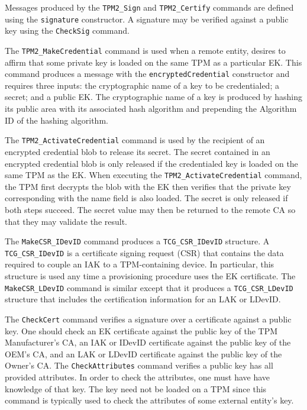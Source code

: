 \documentclass[runningheads]{llncs}
\begin{document}
Messages produced by the \verb|TPM2_Sign| and \verb|TPM2_Certify|
commands are defined using the \verb|signature| constructor. A
signature may be verified against a public key using the
\verb|CheckSig| command.

The \verb|TPM2_MakeCredential| command is used when a remote entity,
desires to affirm that some private key is loaded on the same TPM as a
particular EK. This command produces a message with the
\verb|encryptedCredential| constructor and requires three inputs: the
cryptographic name of a key to be credentialed; a secret; and a public
EK. The cryptographic name of a key is produced by hashing its public
area with its associated hash algorithm and prepending the Algorithm
ID of the hashing algorithm.

The \verb|TPM2_ActivateCredential| command is used by the recipient of
an encrypted credential blob to release its secret.  The secret
contained in an encrypted credential blob is only released if the
credentialed key is loaded on the same TPM as the EK.  When executing
the \verb|TPM2_ActivateCredential| command, the TPM first decrypts the
blob with the EK then verifies that the private key corresponding with
the name field is also loaded. The secret is only released if both
steps succeed. The secret value may then be returned to the remote CA
so that they may validate the result.

The \verb|MakeCSR_IDevID| command produces a \verb|TCG_CSR_IDevID|
structure.  A \verb|TCG_CSR_IDevID| is a certificate signing request
(CSR) that contains the data required to couple an IAK to a
TPM-containing device.  In particular, this structure is used any time
a provisioning procedure uses the EK certificate.  The
\verb|MakeCSR_LDevID| command is similar except that it produces a
\verb|TCG_CSR_LDevID| structure that includes the certification
information for an LAK or LDevID.

The \verb|CheckCert| command verifies a signature over a certificate
against a public key. One should check an EK certificate against the
public key of the TPM Manufacturer's CA, an IAK or IDevID certificate
against the public key of the OEM's CA, and an LAK or LDevID
certificate against the public key of the Owner's CA.  The
\verb|CheckAttributes| command verifies a public key has all provided
attributes.  In order to check the attributes, one must have have
knowledge of that key. The key need not be loaded on a TPM since this
command is typically used to check the attributes of some external
entity's key.
\end{document}
